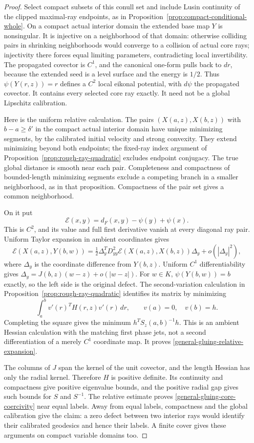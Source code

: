\documentclass[11pt,reqno]{amsart}
\theoremstyle{definition}
\theoremstyle{remark}
\numberwithin{equation}{section}
\begin{document}
\begin{proof}
Select compact subsets of this conull set and include Lusin continuity
of the clipped maximal-ray endpoints, as in
Proposition~\ref{prop:compact-conditional-whole}. On a compact actual
interior domain the extended base map \(Y\) is nonsingular. It is injective
on a neighborhood of that domain: otherwise colliding pairs in shrinking
neighborhoods would converge to a collision of actual core rays; injectivity
there forces equal limiting parameters, contradicting local invertibility.
The propagated covector is \(C^1\), and the canonical one-form pulls back
to \(dr\), because the extended seed is a level surface and the energy is
\(1/2\). Thus \(\psi(Y(r,z))=r\) defines a \(C^2\) local eikonal
potential, with \(d\psi\) the propagated covector. It contains every
selected core ray exactly. It need not be a global Lipschitz calibration.

Here is the uniform relative calculation. The pairs
\((X(a,z),X(b,z))\) with \(b-a\ge\delta'\) in the compact actual
interior domain have unique minimizing segments, by the calibrated initial
velocity and strong convexity. They extend minimizing beyond both endpoints;
the fixed-ray index argument of Proposition~\ref{prop:rough-ray-quadratic}
excludes endpoint conjugacy. The true global distance is smooth near each
pair. Completeness and compactness of bounded-length minimizing segments
exclude a competing branch in a smaller neighborhood, as in that
proposition. Compactness of the pair set gives a common neighborhood.

On it put
\[
 \mathcal E(x,y)=d_F(x,y)-\psi(y)+\psi(x).
\]
This is \(C^2\), and its value and full first derivative vanish at every
diagonal ray pair. Uniform Taylor expansion in ambient coordinates gives
\[
 \mathcal E(X(a,z),Y(b,w))
 =\tfrac12\Delta_y^TD^2_{yy}\mathcal E(X(a,z),X(b,z))\Delta_y
                         +o(|\Delta_y|^2),
\]
where \(\Delta_y\) is the coordinate difference from \(Y(b,z)\).
Uniform \(C^1\) differentiability gives
\(\Delta_y=J(b,z)(w-z)+o(|w-z|)\). For \(w\in K\),
\(\psi(Y(b,w))=b\) exactly, so the left side is the original defect.
The second-variation calculation in
Proposition~\ref{prop:rough-ray-quadratic} identifies its matrix by minimizing
\[
 \int_a^b v'(r)^TH(r,z)v'(r)\,dr,
 \qquad v(a)=0,\quad v(b)=h.
\]
Completing the square gives the minimum \(h^TS_z(a,b)^{-1}h\).
This is an ambient Hessian calculation with the matching first phase jets,
not a second differentiation of a merely \(C^1\) coordinate map. It proves
\eqref{general-gluing-relative-expansion}.

The columns of \(J\) span the kernel of the unit covector, and the length
Hessian has only the radial kernel. Therefore \(H\) is positive definite.
Its continuity and compactness give positive eigenvalue bounds, and the
positive radial gap gives such bounds for \(S\) and \(S^{-1}\).
The relative estimate proves \eqref{general-gluing-core-coercivity} near
equal labels. Away from equal labels, compactness and the global calibration
give the claim: a zero defect between two interior rays would identify
their calibrated geodesics and hence their labels. A finite cover gives
these arguments on compact variable domains too.


\end{proof}
\end{document}
